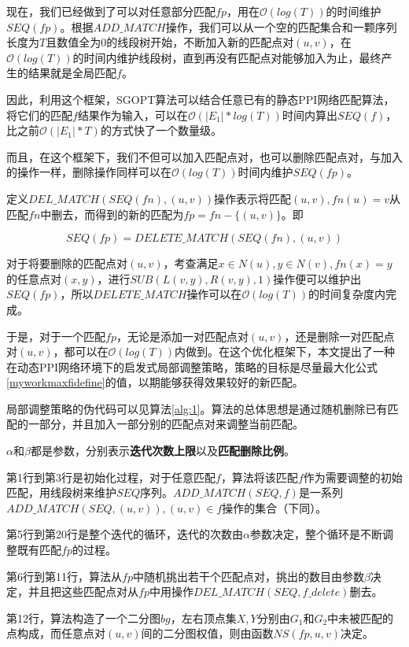 现在，我们已经做到了可以对任意部分匹配$fp$，用在$\mathcal{O}(log(T))$的时间维护$SEQ(fp)$。根据$ADD\_MATCH$操作，我们可以从一个空的匹配集合和一颗序列长度为$T$且数值全为0的线段树开始，不断加入新的匹配点对$(u,v)$，在$\mathcal{O}(log(T))$的时间内维护线段树，直到再没有匹配点对能够加入为止，最终产生的结果就是全局匹配$f$。

因此，利用这个框架，SGOPT算法可以结合任意已有的静态PPI网络匹配算法，将它们的匹配$f$结果作为输入，可以在$\mathcal{O}(|E_1|*log(T))$时间内算出$SEQ(f)$，比之前$\mathcal{O}(|E_1|*T)$的方式快了一个数量级。

而且，在这个框架下，我们不但可以加入匹配点对，也可以删除匹配点对，与加入的操作一样，删除操作同样可以在$\mathcal{O}(log(T))$时间内维护$SEQ(fp)$。

定义$DEL\_MATCH(SEQ(fn),(u,v))$操作表示将匹配$(u,v),fn(u)=v$从匹配$fn$中删去，而得到的新的匹配为$fp=fn-\{(u,v)\}$。即

\begin{equation}\label{myworkfdeletedefine}    
SEQ(fp)=DELETE\_MATCH(SEQ(fn),(u,v))
\end{equation}

对于将要删除的匹配点对$(u,v)$，考查满足$x\in N(u),y\in N(v),fn(x)=y$的任意点对$(x,y)$，进行$SUB(L(v,y),R(v,y),1)$操作便可以维护出$SEQ(fp)$，所以$DELETE\_MATCH$操作可以在$\mathcal{O}(log(T))$的时间复杂度内完成。

于是，对于一个匹配$fp$，无论是添加一对匹配点对$(u,v)$，还是删除一对匹配点对$(u,v)$，都可以在$\mathcal{O}(log(T))$内做到。在这个优化框架下，本文提出了一种在动态PPI网络环境下的启发式局部调整策略，策略的目标是尽量最大化公式\ref{myworkmaxfidefine}的值，以期能够获得效果较好的新匹配。

局部调整策略的伪代码可以见算法\ref{alg:1}。算法的总体思想是通过随机删除已有匹配的一部分，并且加入一部分别的匹配点对来调整当前匹配。

$\alpha$和$\beta$都是参数，分别表示\textbf{迭代次数上限}以及\textbf{匹配删除比例}。

第1行到第3行是初始化过程，对于任意匹配$f$，算法将该匹配$f$作为需要调整的初始匹配，用线段树来维护$SEQ$序列。$ADD\_MATCH(SEQ,f)$是一系列$ADD\_MATCH(SEQ,(u,v)),(u,v)\in f$操作的集合（下同）。

第5行到第20行是整个迭代的循环，迭代的次数由$\alpha$参数决定，整个循环是不断调整既有匹配$fp$的过程。

第6行到第11行，算法从$fp$中随机挑出若干个匹配点对，挑出的数目由参数$\beta$决定，并且把这些匹配点对从$fp$中用操作$DEL\_MATCH(SEQ,f\_delete)$删去。

第12行，算法构造了一个二分图$bg$，左右顶点集$X,Y$分别由$G_1$和$G_2$中未被匹配的点构成，而任意点对$(u,v)$间的二分图权值，则由函数$NS(fp,u,v)$决定。


